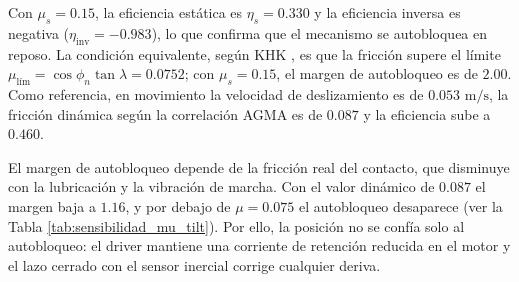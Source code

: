\documentclass[../../General.tex]{subfiles}
\begin{document}
Con $\mu_s = 0.15$, la eficiencia estática es $\eta_s = 0.330$ y la eficiencia inversa es negativa ($\eta_{\text{inv}} = -0.983$), lo que confirma que el mecanismo se autobloquea en reposo. La condición equivalente, según KHK \citep{khk_gear_ref}, es que la fricción supere el límite $\mu_{\text{lím}} = \cos\phi_n \tan\lambda = 0.0752$; con $\mu_s = 0.15$, el margen de autobloqueo es de $2.00$. Como referencia, en movimiento la velocidad de deslizamiento es de $0.053\text{ m/s}$, la fricción dinámica según la correlación AGMA \citep{Shigley11th} es de $0.087$ y la eficiencia sube a $0.460$.

El margen de autobloqueo depende de la fricción real del contacto, que disminuye con la lubricación y la vibración de marcha. Con el valor dinámico de $0.087$ el margen baja a $1.16$, y por debajo de $\mu = 0.075$ el autobloqueo desaparece (ver la Tabla \ref{tab:sensibilidad_mu_tilt}). Por ello, la posición no se confía solo al autobloqueo: el driver mantiene una corriente de retención reducida en el motor y el lazo cerrado con el sensor inercial corrige cualquier deriva.
\end{document}
